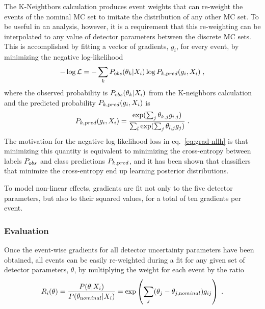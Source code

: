 The K-Neightbors calculation produces event weights that can re-weight the events of the nominal MC set to imitate the distribution of any other MC set. To be useful in an analysis, however, it is a requirement that this re-weighting can be interpolated to any value of detector parameters between the discrete MC sets. This is accomplished by fitting a vector of gradients, $g_i$, for every event, by minimizing the negative log-likelihood
\begin{equation}
    -\log\mathcal{L} = -\sum_k P_{\rm obs}(\theta_k | X_i) \log P_{k, \rm pred}(g_i, X_i)\;, \label{eq:grad-nllh}
\end{equation}
where the observed probability is $P_{\rm obs}(\theta_k | X_i)$ from the K-neighbors calculation and the  predicted probability $P_{k, \rm pred}(g_i, X_i)$ is
\begin{equation}
    P_{k, \rm pred}(g_i, X_i) = \frac{\exp(\sum_j \theta_{k,j} g_{i,j})}{\sum_l\exp(\sum_j \theta_{l,j} g_j)}\;.
\end{equation}
The motivation for the negative log-likelihood loss in eq.~\ref{eq:grad-nllh} is that minimizing this quantity is equivalent to minimizing the cross-entropy between labels $P_{\rm obs}$ and class predictions  $P_{k, \rm pred}$, and it has been shown that classifiers that minimize the cross-entropy end up learning posterior distributions\cite{NNPosteriors}.

To model non-linear effects, gradients are fit not only to the five detector parameters, but also to their squared values, for a total of ten gradients per event.

\subsubsection{Evaluation}
Once the event-wise gradients for all detector uncertainty parameters have been obtained, all events can be easily re-weighted during a fit for any given set of detector parameters, $\theta$, by multiplying the weight for each event by the ratio
\begin{equation}
    R_i(\theta)=\frac{P(\theta|X_i)}{P(\theta_{\rm nominal}|X_i)}=\exp\left(\sum_j (\theta_j - \theta_{j, \rm nominal}) g_{ij}\right)\;.\label{eq:ultrasurf-eval}
\end{equation}


